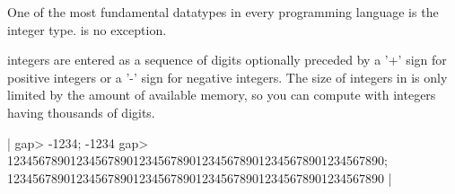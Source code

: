 %

One of the most  fundamental  datatypes in every programming  language is
the integer type.  {\GAP} is no exception.

{\GAP} integers are entered  as a sequence  of digits optionally preceded
by a '+' sign for positive integers or a '-'  sign for negative integers.
The size of integers in {\GAP} is only limited by the amount of available
memory,  so you can compute with integers having thousands of digits.

|    gap> -1234;
    -1234
    gap> 123456789012345678901234567890123456789012345678901234567890;
    123456789012345678901234567890123456789012345678901234567890 |


